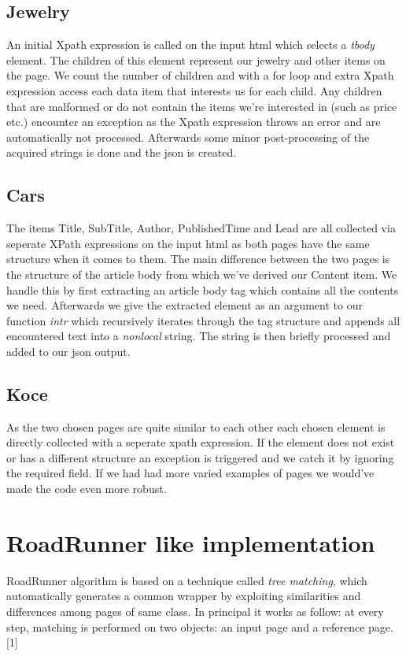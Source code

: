 \documentclass[runningheads]{llncs}
\begin{document}
\subsection{Jewelry}
An initial Xpath expression is called on the input html which selects a \textit{tbody} element. The children of this element represent our jewelry and other items on the page. We count the number of children and with a for loop and extra Xpath expression access each data item that interests us for each child. Any children that are malformed or do not contain the items we're interested in (such as price etc.) encounter an exception as the Xpath expression throws an error and are automatically not processed. Afterwards some minor post-processing of the acquired strings is done and the json is created.


\subsection{Cars}
The items Title, SubTitle, Author, PublishedTime and Lead are all collected via seperate XPath expressions on the input html as both pages have the same structure when it comes to them. The main difference between the two pages is the structure of the article body from which we've derived our Content item. We handle this by first extracting an article body tag which contains all the contents we need. Afterwards we give the extracted element as an argument to our function \textit{intr} which recursively iterates through the tag structure and appends all encountered text into a \textit{nonlocal} string. The string is then briefly processed and added to our json output.

\subsection{Koce}
As the two chosen pages are quite similar to each other each chosen element is directly collected with a seperate xpath expression. If the element does not exist or has a different structure an exception is triggered and we catch it by ignoring the required field. If we had had more varied examples of pages we would've made the code even more robust.

\section{RoadRunner like implementation}

RoadRunner algorithm is based on a technique called \textit{tree matching}, which automatically generates a common wrapper by exploiting similarities and differences among pages of same class. In principal it works as follow:
at every step, matching is performed on two objects: an input page and a reference page. [1]
\end{document}
